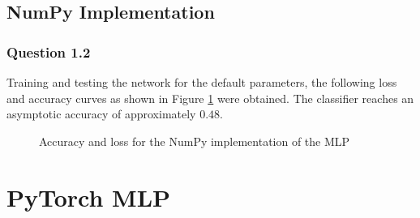\documentclass{article}
\begin{document}
\subsection{NumPy Implementation}
\subsubsection*{Question 1.2}
Training and testing the network for the default parameters, the following loss and accuracy curves as shown in Figure \ref{fig:npcurves} were obtained. The classifier reaches an asymptotic accuracy of approximately $0.48$.
\begin{figure}[H]
	\centering
	\caption{Accuracy and loss for the NumPy implementation of the MLP}
	\label{fig:npcurves}
\end{figure}
\section{PyTorch MLP}
\end{document}
